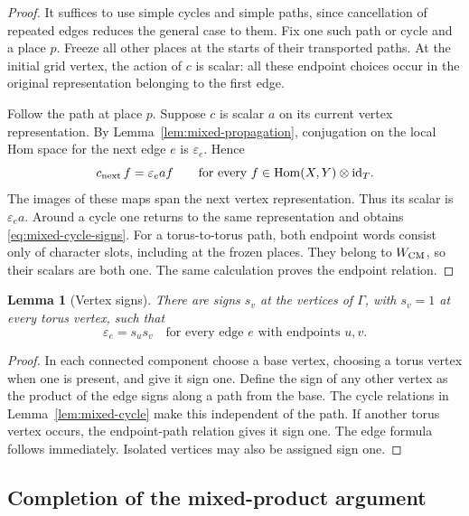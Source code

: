 \documentclass[11pt]{article}
\numberwithin{equation}{section}
\newtheorem{lemma}[theorem]{Lemma}
\theoremstyle{definition}
\theoremstyle{remark}
\begin{document}
\begin{proof}
It suffices to use simple cycles and simple paths, since cancellation
of repeated edges reduces the general case to them.  Fix one such
path or cycle and a place $p$.  Freeze all other places at the
starts of their transported paths.  At the initial grid vertex,
the action of $c$ is scalar: all these endpoint choices occur in
the original representation belonging to the first edge.

Follow the path at place $p$.  Suppose $c$ is scalar $a$ on its
current vertex representation.  By
Lemma~\ref{lem:mixed-propagation}, conjugation on the local Hom
space for the next edge $e$ is $\varepsilon_e$.  Hence
\[
 c_{\rm next}\,f=\varepsilon_e a f
 \qquad
 \text{for every }f\in\operatorname{Hom}(X,Y)\otimes\mathrm{id}_T.
\]
The images of these maps span the next vertex representation.
Thus its scalar is $\varepsilon_e a$.  Around a cycle one returns
to the same representation and obtains
\eqref{eq:mixed-cycle-signs}.  For a torus-to-torus path, both
endpoint words consist only of character slots, including at the
frozen places.  They belong to $W_{\rm CM}$, so their scalars are
both one.  The same calculation proves the endpoint relation.
\end{proof}

\begin{lemma}[Vertex signs]\label{lem:mixed-node-signs}
There are signs $s_v$ at the vertices of $\Gamma$, with $s_v=1$
at every torus vertex, such that
\[
 \varepsilon_e=s_us_v
 \quad\text{for every edge }e\text{ with endpoints }u,v.
\]
\end{lemma}

\begin{proof}
In each connected component choose a base vertex, choosing a torus
vertex when one is present, and give it sign one.  Define the sign
of any other vertex as the product of the edge signs along a path
from the base.  The cycle relations in
Lemma~\ref{lem:mixed-cycle} make this independent of the path.
If another torus vertex occurs, the endpoint-path relation gives
it sign one.  The edge formula follows immediately.  Isolated
vertices may also be assigned sign one.
\end{proof}

\subsection{Completion of the mixed-product argument}
\end{document}

